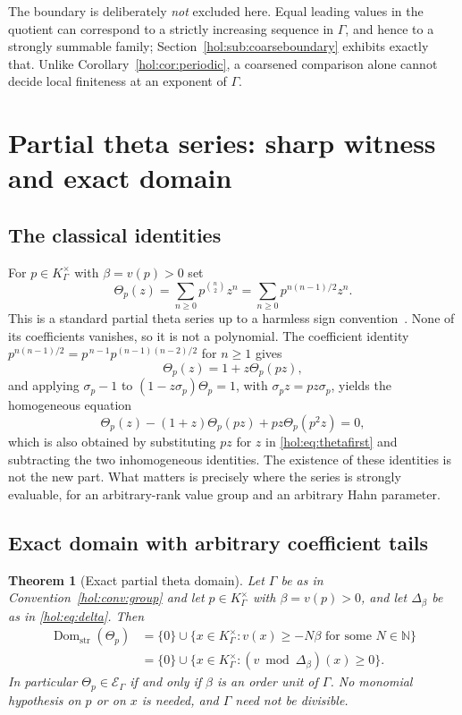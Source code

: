 \documentclass[11pt]{article}
\numberwithin{equation}{section}
\newtheorem{theorem}{Theorem}[section]
\theoremstyle{definition}
\theoremstyle{remark}
\newcommand{\N}{\mathbb N}
\newcommand{\K}{K_\Gamma}
\newcommand{\E}{\mathcal E_\Gamma}
\newcommand{\Dom}{\operatorname{Dom}_{\mathrm{str}}}
\begin{document}
The boundary is deliberately \emph{not} excluded here. Equal leading values in
the quotient can correspond to a strictly increasing sequence in $\Gamma$, and
hence to a strongly summable family; Section~\ref{hol:sub:coarseboundary}
exhibits exactly that. Unlike Corollary~\ref{hol:cor:periodic}, a coarsened
comparison alone cannot decide local finiteness at an exponent of $\Gamma$.

\section{Partial theta series: sharp witness and exact domain}
\label{hol:sec:theta}

\subsection{The classical identities}

For $p\in\K^\times$ with $\beta=v(p)>0$ set
\begin{equation}\label{hol:eq:theta}
 \Theta_p(z)=\sum_{n\ge0}p^{\binom n2}z^n
 =\sum_{n\ge0}p^{n(n-1)/2}z^n.
\end{equation}
This is a standard partial theta series up to a harmless sign
convention~\cite{andrewswarnaar}. None of its coefficients vanishes, so it is
not a polynomial. The coefficient identity
$p^{n(n-1)/2}=p^{\,n-1}p^{(n-1)(n-2)/2}$ for $n\ge1$ gives
\begin{equation}\label{hol:eq:thetafirst}
 \Theta_p(z)=1+z\Theta_p(pz),
\end{equation}
and applying $\sigma_p-1$ to $(1-z\sigma_p)\Theta_p=1$, with
$\sigma_pz=pz\sigma_p$, yields the homogeneous equation
\begin{equation}\label{hol:eq:thetahom}
 \Theta_p(z)-(1+z)\Theta_p(pz)+pz\Theta_p(p^2z)=0,
\end{equation}
which is also obtained by substituting $pz$ for $z$ in
\eqref{hol:eq:thetafirst} and subtracting the two inhomogeneous identities.
The existence of these identities is not the new part. What matters is
precisely where the series is strongly evaluable, for an arbitrary-rank value
group and an arbitrary Hahn parameter.

\subsection{Exact domain with arbitrary coefficient tails}

\begin{theorem}[Exact partial theta domain]\label{hol:thm:thetadomain}
Let $\Gamma$ be as in Convention~\ref{hol:conv:group} and let $p\in\K^\times$
with $\beta=v(p)>0$, and let $\Delta_\beta$ be as in \eqref{hol:eq:delta}.
Then
\begin{align}
 \Dom(\Theta_p)
 &=\{0\}\cup\{x\in\K^\times:v(x)\ge-N\beta\text{ for some }N\in\N\}
 \label{hol:eq:thetadomain}\\
 &=\{0\}\cup\{x\in\K^\times:(v\bmod\Delta_\beta)(x)\ge0\}.\nonumber
\end{align}
In particular $\Theta_p\in\E$ if and only if $\beta$ is an order unit of
$\Gamma$. No monomial hypothesis on $p$ or on $x$ is needed, and $\Gamma$ need
not be divisible.
\end{theorem}
\end{document}
